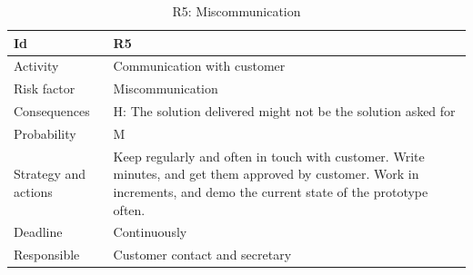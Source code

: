 \documentclass[11pt]{book}
\begin{document}
\begin{table}[H]
\centering
\begin{tabular}{ l  p{11cm} }
    Id                      & R5                                                                          \\ \hline
    Activity                & Communication with customer                                                 \\ \hline
    Risk factor             & Miscommunication                                                            \\ \hline
    Consequences            & H: The solution delivered might not be the solution asked for               \\ \hline
    Probability             & M                                                                           \\ \hline
    Strategy and actions    & Keep regularly and often in touch with customer. Write minutes, and get 
                              them approved by customer. Work in increments, and demo the current 
                              state of the prototype often.                                               \\ \hline
    Deadline                & Continuously                                                                \\ \hline
    Responsible             & Customer contact and secretary                                              \\ 
\end{tabular}
\caption{R5: Miscommunication}
\label{tab:risk_5}
\end{table}
\end{document}
